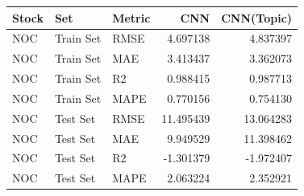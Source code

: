 \begin{tabular}{lllrr}
\toprule
Stock & Set & Metric & CNN & CNN(Topic) \\
\midrule
NOC & Train Set & RMSE & 4.697138 & 4.837397 \\
NOC & Train Set & MAE & 3.413437 & 3.362073 \\
NOC & Train Set & R2 & 0.988415 & 0.987713 \\
NOC & Train Set & MAPE & 0.770156 & 0.754130 \\
NOC & Test Set & RMSE & 11.495439 & 13.064283 \\
NOC & Test Set & MAE & 9.949529 & 11.398462 \\
NOC & Test Set & R2 & -1.301379 & -1.972407 \\
NOC & Test Set & MAPE & 2.063224 & 2.352921 \\
\bottomrule
\end{tabular}
